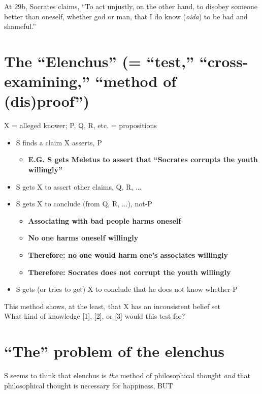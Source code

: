 \documentclass[11pt]{article}
\begin{document}
\noindent At 29b, Socrates claims, ``To act unjustly, on the other hand, to disobey someone better than oneself, whether god or man, that I do know (\emph{oida}) to be bad and shameful.''

\section*{The ``Elenchus'' (= ``test,'' ``cross-examining,'' ``method of (dis)proof'')}
\noindent X = alleged knower; P, Q, R, etc. = propositions
\begin{itemize}
\item{S finds a claim X asserts, P}\begin{itemize}\item{\textbf{E.G. S gets Meletus to assert that ``Socrates corrupts the youth willingly''}}\end{itemize}
\item{S gets X to assert other claims, Q, R, ...}

\item{S gets X to conclude (from Q, R, ...), not-P}\begin{itemize}\item{\textbf{Associating with bad people harms oneself}}\item{\textbf{No one harms oneself willingly}}\item{\textbf{Therefore: no one would harm one's associates willingly}}\item{\textbf{Therefore: Socrates does not corrupt the youth willingly}}\end{itemize}

\item{S gets (or tries to get) X to conclude that he does not know whether P}\end{itemize}
\noindent This method shows, at the least, that X has an inconsistent belief set\\

\noindent What kind of knowledge [1], [2], or [3] would this test for?
\vspace*{-2mm}
\section*{``The'' problem of the elenchus}
\noindent S seems to think that elenchus is \emph{the} method of philosophical thought \emph{and} that philosophical thought is necessary for happiness, BUT
\vspace*{2mm}
\end{document}
